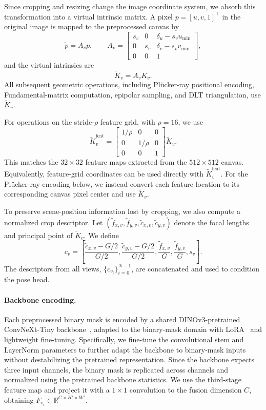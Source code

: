 Since cropping and resizing change the image coordinate system, we absorb
this transformation into a virtual intrinsic matrix. A pixel
\(p=[u,v,1]^\top\) in the original image is mapped to the preprocessed
canvas by
\[
\tilde{p}=A_v p,
\qquad
A_v =
\begin{bmatrix}
s_v & 0 & \delta_u - s_v u_{\min} \\
0 & s_v & \delta_v - s_v v_{\min} \\
0 & 0 & 1
\end{bmatrix},
\]
and the virtual intrinsics are
\[
\tilde{K}_v = A_v K_v .
\]
All subsequent geometric operations, including Pl\"ucker-ray positional encoding,
Fundamental-matrix computation, epipolar sampling, and DLT triangulation,
use \(\tilde{K}_v\).

For operations on the stride-\(\rho\) feature grid, with \(\rho=16\), we
use
\[
\tilde{K}^{\mathrm{feat}}_v =
\begin{bmatrix}
1/\rho & 0 & 0 \\
0 & 1/\rho & 0 \\
0 & 0 & 1
\end{bmatrix}
\tilde{K}_v .
\]
This matches the \(32 \times 32\) feature maps extracted from the
\(512 \times 512\) canvas.
Equivalently, feature-grid coordinates can be used directly with
\(\tilde{K}^{\mathrm{feat}}_v\).
For the Pl\"ucker-ray encoding below, we instead convert each feature location to its corresponding canvas pixel center and use \(\tilde{K}_v\).

To preserve scene-position information lost by cropping, we also compute a
normalized crop descriptor. Let
\((\tilde{f}_{x,v},\tilde{f}_{y,v},\tilde{c}_{x,v},\tilde{c}_{y,v})\)
denote the focal lengths and principal point of \(\tilde{K}_v\). We define
\[
c_v =
\left[
\frac{\tilde{c}_{x,v}-G/2}{G/2},
\frac{\tilde{c}_{y,v}-G/2}{G/2},
\frac{\tilde{f}_{x,v}}{G},
\frac{\tilde{f}_{y,v}}{G},
s_v
\right].
\]
The descriptors from all views, \(\{c_{v_i}\}_{i=0}^{N-1}\), are
concatenated and used to condition the pose head.

\paragraph{Backbone encoding.}
Each preprocessed binary mask is encoded by a shared DINOv3-pretrained ConvNeXt-Tiny backbone~\cite{simeoni2025dinov3,liu2022convnext}, adapted to the binary-mask domain with LoRA~\cite{hu2022lora} and lightweight fine-tuning.
Specifically, we fine-tune the convolutional stem and LayerNorm parameters to further adapt the backbone to binary-mask inputs without destabilizing the pretrained representation.
Since the backbone expects three input channels, the binary mask is replicated across channels and normalized using the pretrained backbone statistics.
We use the third-stage feature map and project it with a \(1\times1\) convolution to the fusion dimension \(C\), obtaining \(F_{v_i}\in\mathbb{R}^{C\times H'\times W'}\).



